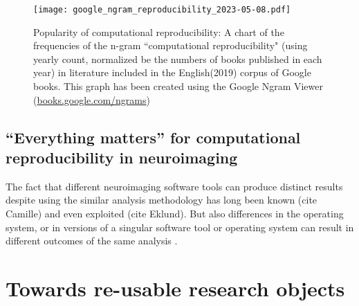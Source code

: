 \begin{figure}
	\centering
	\texttt{[image: google\_ngram\_reproducibility\_2023-05-08.pdf]}
	\caption[Computational reproducibility in the literature]{Popularity of computational reproducibility: A chart of the frequencies of the n-gram ``computational reproducibility" (using yearly count, normalized be the numbers of books published in each year) in literature included in the English(2019) corpus of Google books. This graph has been created using the Google Ngram Viewer (\href{https://books.google.com/ngrams/info}{books.google.com/ngrams}) \citep{michel2011quantitative}}
	\label{fig:ngram}
\end{figure}


\subsection{``Everything matters'' for computational reproducibility in neuroimaging}



The fact that different neuroimaging software tools can produce distinct results despite using the similar analysis methodology has long been known (cite Camille) and even exploited (cite Eklund).
But also differences in the operating system, or in versions of a singular software tool or operating system can result in different outcomes of the same analysis \citep{gronenschild2012effects} \citep{glatard2015reproducibility}.


\section{Towards re-usable research objects}

